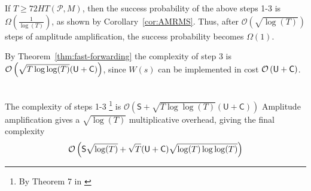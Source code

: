 \documentclass{article}
\newcommand{\bigO}[1]{\mathcal{O}\left( #1 \right)}
\newcommand{\PM}{\mathcal{P}}
\begin{document}
 If $T\geq 72 HT(\PM,M)$, then the success probability of the above steps 1-3  is $\Omega\left(\frac{1}{\log(T)}\right)$, as shown by Corollary~\ref{cor:AMRMS}. Thus, after $\bigO{\sqrt{\log(T)}}$ steps of amplitude amplification, the success probability becomes $\Omega(1)$. 

 By Theorem~\ref{thm:fast-forwarding} the complexity of step 3 is $\bigO{\sqrt{T\log\log(T)}({\sf U}+{\sf C})}$, since $W(s)$ can be implemented in cost $\bigO{{\sf U}+{\sf C}}$.

\\
The complexity of steps 1-3 \footnote{By Theorem 7 in \cite{Ambainis2019QuadraticSF}} is
$\bigO{\mathsf{S}+\sqrt{T\log\log(T)}(\mathsf{U}+\mathsf{C})}$
Amplitude amplification gives a $\sqrt{\log(T)}$ multiplicative overhead, giving the final complexity $$\bigO{\mathsf{S}\sqrt{\log(T)}+\sqrt{T}({\sf U}+{\sf C})\sqrt{\log(T)\log\log(T)}}$$



\end{document}
